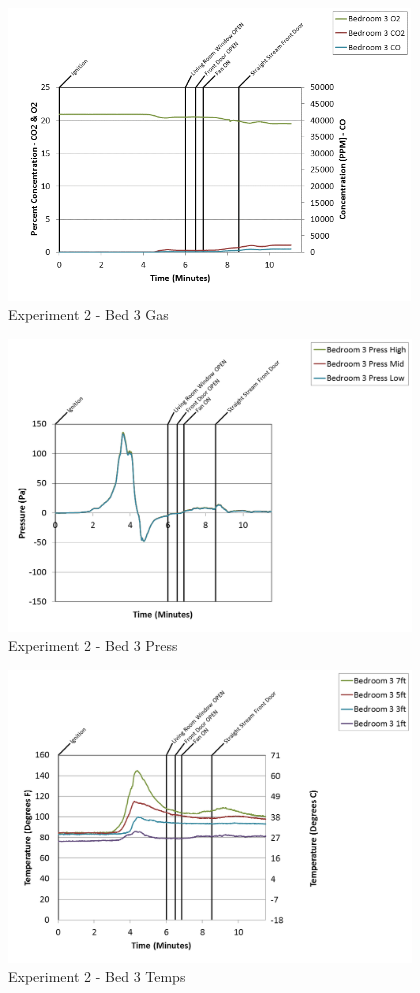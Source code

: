 \documentclass{article}
\begin{document}
\begin{appendices}
\begin{figure}[h!]
	\centering
	\includegraphics[height=3.05in]{0_Images/Results_Charts/Exp_2_Charts/Bed3Gas.png}
	\caption{Experiment 2 - Bed 3 Gas}
\end{figure}

\clearpage

\begin{figure}[h!]
	\centering
	\includegraphics[height=3.05in]{0_Images/Results_Charts/Exp_2_Charts/Bed3Press.png}
	\caption{Experiment 2 - Bed 3 Press}
\end{figure}


\begin{figure}[h!]
	\centering
	\includegraphics[height=3.05in]{0_Images/Results_Charts/Exp_2_Charts/Bed3Temps.png}
	\caption{Experiment 2 - Bed 3 Temps}
\end{figure}


\end{appendices}
\end{document}
